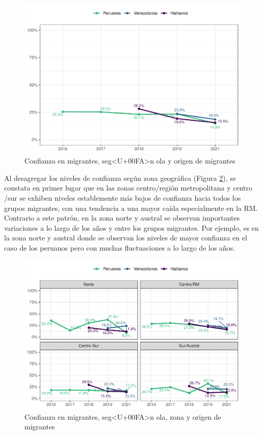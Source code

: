 \documentclass[
  12pt,
]{book}
\begin{document}
\begin{figure}

{\centering \includegraphics{reporte-elsoc_files/figure-latex/conf-wave-1} 

}

\caption{Confianza en migrantes, seg<U+00FA>n ola y origen de migrantes}\label{fig:conf-wave}
\end{figure}

Al desagregar los niveles de confianza según zona geográfica (Figura \ref{fig:conf-zona}), se constata en primer lugar que en las zonas centro/región metropolitana y centro /sur se exhiben niveles establemente más bajos de confianza hacia todos los grupos migrantes, con una tendencia a una mayor caída especialmente en la RM. Contrario a este patrón, en la zona norte y austral se observan importantes variaciones a lo largo de los años y entre los grupos migrantes. Por ejemplo, es en la zona norte y austral donde se observan los niveles de mayor confianza en el caso de los peruanos pero con muchas fluctuaciones a lo largo de los años.

\begin{figure}

{\centering \includegraphics{reporte-elsoc_files/figure-latex/conf-zona-1} 

}

\caption{Confianza en migrantes, seg<U+00FA>n ola, zona y origen de migrantes}\label{fig:conf-zona}
\end{figure}
\end{document}
